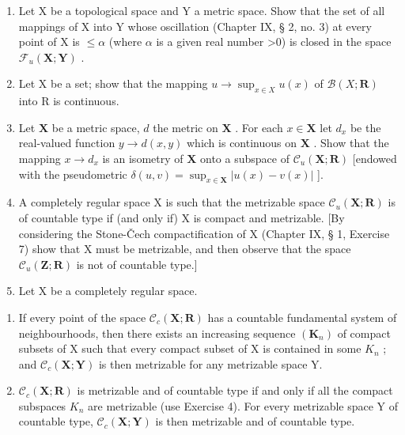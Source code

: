 \ExerciseSection

\begin{enumerate}
\def\labelenumi{\arabic{enumi})}
\item
  Let X be a topological space and Y a metric space. Show that the set of all mappings of X into Y whose oscillation (Chapter IX, § 2, no. 3) at every point of X is \(\leqslant\alpha\) (where \(\alpha\) is a given real number \textgreater0) is closed in the space \(\mathcal{F}_{u}(\mathbf{X};\mathbf{Y})\) .
\item
  Let X be a set; show that the mapping \(u \to \sup_{x \in X} u(x)\) of \(\mathcal{B}(X; \mathbf{R})\) into R is continuous.
\item
  Let \(\mathbf{X}\) be a metric space, \(d\) the metric on \(\mathbf{X}\) . For each \(x \in \mathbf{X}\) let \(d_x\) be the real-valued function \(y \to d(x, y)\) which is continuous on \(\mathbf{X}\) . Show that the mapping \(x \to d_x\) is an isometry of \(\mathbf{X}\) onto a subspace of \(\mathcal{C}_u(\mathbf{X}; \mathbf{R})\) {[}endowed with the pseudometric \(\delta(u, v) = \sup_{x \in \mathbf{X}} |u(x) - v(x)|\) {]}.
\item
  A completely regular space X is such that the metrizable space \(\mathcal{C}_{u}(\mathbf{X};\mathbf{R})\) is of countable type if (and only if) X is compact and metrizable. {[}By considering the Stone-Čech compactification of X (Chapter IX, § 1, Exercise 7) show that X must be metrizable, and then observe that the space \(\mathcal{C}_{u}(\mathbf{Z};\mathbf{R})\) is not of countable type.{]}
\item
  Let X be a completely regular space.
\end{enumerate}

\begin{enumerate}
\def\labelenumi{\alph{enumi})}
\tightlist
\item
  If every point of the space \(\mathcal{C}_{c}(\mathbf{X};\mathbf{R})\) has a countable fundamental system of neighbourhoods, then there exists an increasing sequence \((\mathbf{K}_{n})\) of compact subsets of X such that every compact subset of X is contained in some \(K_{n}\) ; and \(\mathcal{C}_{c}(\mathbf{X};\mathbf{Y})\) is then metrizable for any metrizable space Y.
\item
  \(\mathcal{C}_{c}(\mathbf{X};\mathbf{R})\) is metrizable and of countable type if and only if all the compact subspaces \(K_{n}\) are metrizable (use Exercise 4). For every metrizable space Y of countable type, \(\mathcal{C}_{c}(\mathbf{X};\mathbf{Y})\) is then metrizable and of countable type.
\end{enumerate}

